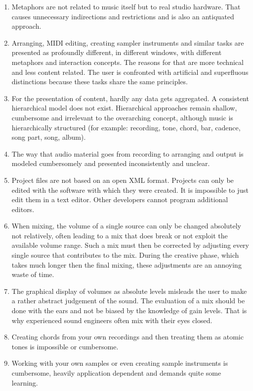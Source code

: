 \documentclass[12pt]{article}
\begin{document}
\begin{enumerate}
\item Metaphors are not related to music itself but to real studio hardware. That causes unnecessary indirections and restrictions and is also an antiquated approach.
\item Arranging, MIDI editing, creating sampler instruments and similar tasks are presented as profoundly different, in different windows, with different metaphors and interaction concepts. The reasons for that are more technical and less content related. The user is confronted with artificial and superfluous distinctions because these tasks share the same principles.
\item For the presentation of content, hardly any data gets aggregated. A consistent hierarchical model does not exist. Hierarchical approaches remain shallow, cumbersome and irrelevant to the overarching concept, although music is hierarchically structured (for example: recording, tone, chord, bar, cadence, song part, song, album).
\item The way that audio material goes from recording to arranging and output is  modeled cumbersomely and presented  inconsistently and unclear.
\item Project files are not based on an open XML format. Projects can only be edited with the software with which they were created. It is impossible to just edit them in a text editor. Other developers cannot program additional editors.
\item When mixing, the volume of a single source can only be changed absolutely not relatively, often leading to a mix that does break or not exploit the available volume range. Such a mix must then be corrected by adjusting every single source that contributes to the mix. During the creative phase, which takes much longer then the final mixing, these adjustments are an annoying waste of time.
\item The graphical display of volumes as absolute levels misleads the user to make a rather abstract judgement of the sound. The evaluation of a mix should be done with the ears and not be biased by the knowledge of gain levels. That is why experienced sound engineers often mix with their eyes closed.
\item Creating chords from your own recordings and then treating them as atomic tones is impossible or cumbersome.
\item Working with your own samples or even creating sample instruments is cumbersome, heavily application dependent and demands quite some learning.
\end{enumerate}
\end{document}
